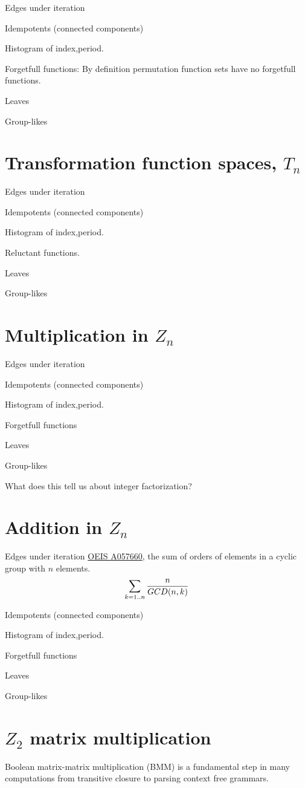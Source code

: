 \documentclass{article}
\begin{document}
Edges under iteration

Idempotents (connected components)

Histogram of index,period.

Forgetfull functions: By definition permutation function sets have no forgetfull functions.

Leaves

Group-likes
\section{Transformation function spaces, $T_{n}$}

Edges under iteration

Idempotents (connected components)

Histogram of index,period.

Reluctant functions. \cite{mullin1970} 

Leaves

Group-likes



\section{Multiplication in $Z_{n}$ }

Edges under iteration

Idempotents (connected components)

Histogram of index,period.

Forgetfull functions

Leaves

Group-likes


What does this tell us about integer factorization?


\section{Addition in $Z_{n}$ }

Edges under iteration
\href{http://www.oeis.org/A057660}{OEIS A057660}, the sum of orders of elements in a cyclic group with $n$ elements. $$\sum_{k=1..n} {n \over GCD(n,k)}$$

Idempotents (connected components)

Histogram of index,period.

Forgetfull functions

Leaves

Group-likes



\section{$Z_{2}$ matrix multiplication }
Boolean matrix-matrix multiplication (BMM) is a fundamental step in many computations from transitive closure to parsing context free grammars.
\end{document}
